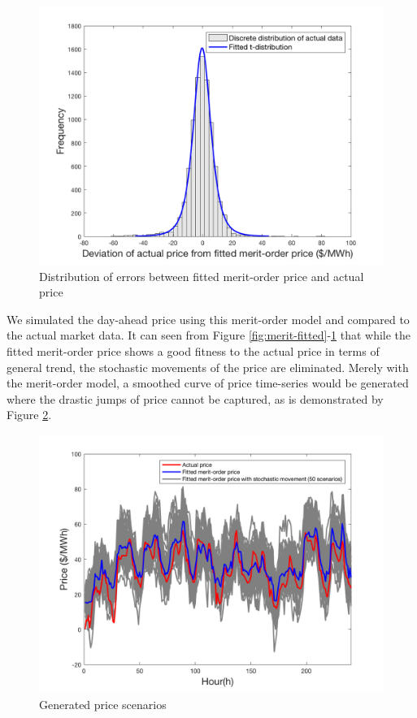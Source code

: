 \begin{figure}[h!]
	\centering
	\includegraphics[width=0.9\linewidth]{Figures/4_Error-distribution}
	\caption{Distribution of errors between fitted merit-order price and actual price}
	\label{fig:merit-error}
\end{figure}

We simulated the day-ahead price using this merit-order model and compared to the actual market data. It can seen from Figure \ref{fig:merit-fitted}-\ref{fig:merit-error} that while the fitted merit-order price shows a good fitness to the actual price in terms of general trend, the stochastic movements of the price are eliminated. Merely with the merit-order model, a smoothed curve of price time-series would be generated where the drastic jumps of price cannot be captured, as is demonstrated by Figure \ref{fig:price-example}.

\begin{figure}[h!]
	\centering
	\includegraphics[width=0.95\linewidth]{Figures/5_Example-simulated_price}
	\caption{Generated price scenarios}
	\label{fig:price-example}
\end{figure}

